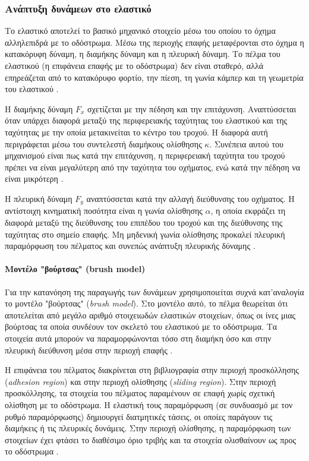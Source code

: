 \subsubsection{Ανάπτυξη δυνάμεων στο ελαστικό}
Το ελαστικό αποτελεί το βασικό μηχανικό στοιχείο μέσω του οποίου το
όχημα αλληλεπιδρά με το οδόστρωμα. Μέσω της περιοχής επαφής
μεταφέρονται στο όχημα η κατακόρυφη δύναμη, η διαμήκης δύναμη και η
πλευρική δύναμη. Το πέλμα του ελαστικού (η επιφάνεια επαφής με το οδόστρωμα) 
δεν είναι σταθερό, αλλά επηρεάζεται από το κατακόρυφο φορτίο, την πίεση, 
τη γωνία κάμπερ και τη γεωμετρία του ελαστικού \cite{Pacejka2012,Farroni2014TRT}.


Η διαμήκης δύναμη $F_x$ σχετίζεται με την πέδηση και την
επιτάχυνση. Αναπτύσσεται όταν υπάρχει διαφορά μεταξύ της περιφερειακής
ταχύτητας του ελαστικού και της ταχύτητας με την οποία μετακινείται το
κέντρο του τροχού. Η διαφορά αυτή περιγράφεται μέσω του συντελεστή
διαμήκους ολίσθησης $\kappa$. Συνέπεια αυτού του μηχανισμού είναι πως 
κατά την επιτάχυνση, η περιφερειακή
ταχύτητα του τροχού πρέπει να είναι μεγαλύτερη από την ταχύτητα του
οχήματος, ενώ κατά την πέδηση να είναι μικρότερη
\cite{Pacejka2012,Perantoni2014}.

Η πλευρική δύναμη $F_y$ αναπτύσσεται κατά την αλλαγή διεύθυνσης του
οχήματος. Η αντίστοιχη κινηματική ποσότητα είναι η γωνία ολίσθησης
$\alpha$, η οποία εκφράζει τη διαφορά μεταξύ της διεύθυνσης του επιπέδου
του τροχού και της διεύθυνσης της ταχύτητας στο σημείο επαφής. Μη
μηδενική γωνία ολίσθησης προκαλεί πλευρική παραμόρφωση του πέλματος και
συνεπώς ανάπτυξη πλευρικής δύναμης
\cite{Pacejka2012,Perantoni2014}.



\paragraph{Μοντέλο "βούρτσας" (brush model)}
Για την κατανόηση της παραγωγής των δυνάμεων χρησιμοποιείται συχνά κατ'αναλογία το
μοντέλο "βούρτσας" (\textit{brush model}). Στο μοντέλο αυτό, το πέλμα
θεωρείται ότι αποτελείται από μεγάλο αριθμό στοιχειωδών ελαστικών στοιχείων,
όπως οι ίνες μιας βούρτσας τα οποία συνδέουν τον σκελετό του ελαστικού 
με το οδόστρωμα. Τα στοιχεία αυτά μπορούν να
παραμορφώνονται τόσο στη διαμήκη όσο και στην πλευρική διεύθυνση μέσα
στην περιοχή επαφής \cite{Pacejka2012,Sakhnevych2022}.

Η επιφάνεια του πέλματος διακρίνεται στη βιβλιογραφία στην περιοχή προσκόλλησης (\textit{adhesion region})
και στην περιοχή ολίσθησης (\textit{sliding region}). Στην περιοχή προσκόλλησης, τα στοιχεία του πέλματος
παραμένουν σε επαφή χωρίς σχετική ολίσθηση με το οδόστρωμα. Η ελαστική
τους παραμόρφωση (σε συνδυασμό με τον ρυθμό παραμόρφωσης) δημιουργεί διατμητικές τάσεις,
οι οποίες παράγουν τις διαμήκεις ή τις πλευρικές δυνάμεις. Στην περιοχή
ολίσθησης, η παραμόρφωση των στοιχείων έχει φτάσει το διαθέσιμο όριο
τριβής και τα στοιχεία ολισθαίνουν ως προς το οδόστρωμα
\cite{Pacejka2012,Sakhnevych2022}.

